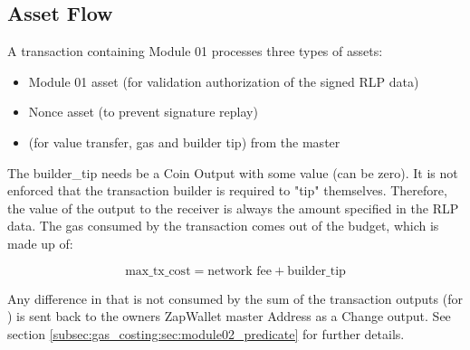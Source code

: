 \subsection{Asset Flow}
A transaction containing Module 01 processes three types of assets:
\begin{itemize}
    \item Module 01 asset (for validation authorization of the signed RLP data)
    \item Nonce asset (to prevent signature replay)
    \item {} (for value transfer, gas and builder tip) from the master
\end{itemize}


The builder\_tip needs be a Coin Output with some value (can be zero). It is not enforced that the transaction builder
is required to "tip" themselves. Therefore, the value of the  output to the receiver is always the amount specified in the RLP
data. The gas consumed by the transaction comes out of the  budget, which is made up of:

\[
\text{max\_tx\_cost} = \text{network fee} + \text{builder\_tip}
\]

Any difference in  that is not consumed by the sum of the transaction outputs (for ) is sent back to the
owners ZapWallet master Address as a Change output. See section \ref{subsec:gas_costing:sec:module02_predicate} for further details.


